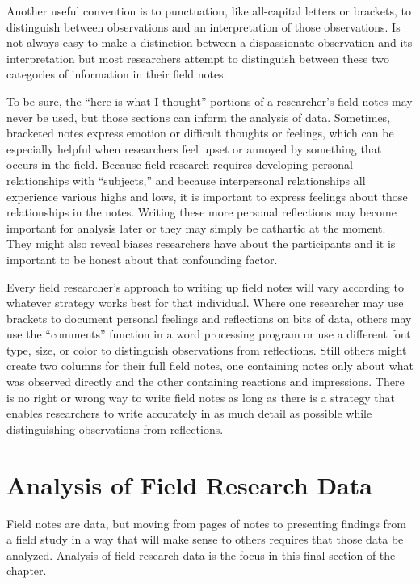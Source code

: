 Another useful convention is to punctuation, like all-capital letters or brackets, to distinguish between observations and an interpretation of those observations. Is not always easy to make a distinction between a dispassionate observation and its interpretation but most researchers attempt to distinguish between these two categories of information in their field notes.

To be sure, the ``here is what I thought'' portions of a researcher's field notes may never be used, but those sections can inform the analysis of data. Sometimes, bracketed notes express emotion or difficult thoughts or feelings, which can be especially helpful when researchers feel upset or annoyed by something that occurs in the field. Because field research requires developing personal relationships with ``subjects,'' and because interpersonal relationships all experience various highs and lows, it is important to express feelings about those relationships in the notes. Writing these more personal reflections may become important for analysis later or they may simply be cathartic at the moment. They might also reveal biases researchers have about the participants and it is important to be honest about that confounding factor.

Every field researcher's approach to writing up field notes will vary according to whatever strategy works best for that individual. Where one researcher may use brackets to document personal feelings and reflections on bits of data, others may use the ``comments'' function in a word processing program or use a different font type, size, or color to distinguish observations from reflections. Still others might create two columns for their full field notes, one containing notes only about what was observed directly and the other containing reactions and impressions. There is no right or wrong way to write field notes as long as there is a strategy that enables researchers to write accurately in as much detail as possible while distinguishing observations from reflections.

\section{Analysis of Field Research Data}

Field notes are data, but moving from pages of notes to presenting findings from a field study in a way that will make sense to others requires that those data be analyzed. Analysis of field research data is the focus in this final section of the chapter.


